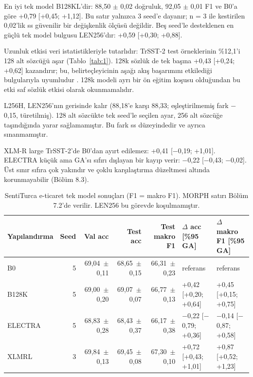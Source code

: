\documentclass[11pt]{article}
\begin{document}
En iyi tek model B128KL'dir: 88,50 $\pm$ 0,02 doğruluk, 92,05 $\pm$ 0,01 F1 ve B0'a göre +0,79 [+0,45; +1,12]. Bu satır yalnızca 3 seed'e dayanır; n = 3 ile kestirilen 0,02'lik ss güvenilir bir değişkenlik ölçüsü değildir. Beş seed'le desteklenen en güçlü tek model bulgusu LEN256'dır: +0,59 [+0,30; +0,88].

Uzunluk etkisi veri istatistikleriyle tutarlıdır: TrSST-2 test örneklerinin \%12,1'i 128 alt sözcüğü aşar (Tablo~\ref{tab:1}). 128k sözlük de tek başına +0,43 [+0,24; +0,62] kazandırır; bu, belirteçleyicinin aşağı akış başarımını etkilediği bulgularıyla uyumludur \citep{toraman2023,rust2021}. 128k modeli ayrı bir ön eğitim koşusu olduğundan bu etki saf sözlük etkisi olarak okunmamalıdır.

L256H, LEN256'nın gerisinde kalır (88,18'e karşı 88,33; eşleştirilmemiş fark $-$0,15, türetilmiş). 128 alt sözcükte tek seed'le seçilen ayar, 256 alt sözcüğe taşındığında yarar sağlamamıştır. Bu fark ss düzeyindedir ve ayrıca sınanmamıştır.

XLM-R large \citep{conneau2020} TrSST-2'de B0'dan ayırt edilemez: +0,41 [$-$0,19; +1,01]. ELECTRA \citep{clark2020} küçük ama GA'sı sıfırı dışlayan bir kayıp verir: $-$0,22 [$-$0,43; $-$0,02]. Üst sınır sıfıra çok yakındır ve çoklu karşılaştırma düzeltmesi altında korunmayabilir (Bölüm 8.3).

\begin{table}[!htbp]
\centering
\footnotesize
\setlength{\tabcolsep}{3pt}
\begin{tabular}{lrrrrll}
\toprule
Yapılandırma & Seed & Val acc & Test acc & Test makro F1 & $\Delta$ acc [\%95 GA] & $\Delta$ makro F1 [\%95 GA] \\
\midrule
B0 & \mbox{5} & \mbox{69,04 $\pm$ 0,11} & \mbox{68,65 $\pm$ 0,15} & \mbox{66,31 $\pm$ 0,23} & referans & referans \\
B128K & \mbox{5} & \mbox{69,00 $\pm$ 0,20} & \mbox{69,07 $\pm$ 0,07} & \mbox{66,77 $\pm$ 0,13} & +0,42 [+0,20; +0,64] & +0,45 [+0,15; +0,75] \\
ELECTRA & \mbox{5} & \mbox{68,83 $\pm$ 0,28} & \mbox{68,43 $\pm$ 0,37} & \mbox{66,17 $\pm$ 0,38} & $-$0,22 [$-$0,79; +0,36] & $-$0,14 [$-$0,87; +0,58] \\
XLMRL & \mbox{3} & \mbox{69,84 $\pm$ 0,13} & \mbox{69,45 $\pm$ 0,08} & \mbox{67,30 $\pm$ 0,10} & +0,72 [+0,43; +1,01] & +0,87 [+0,52; +1,23] \\
\bottomrule
\end{tabular}
\caption{SentiTurca e-ticaret tek model sonuçları (F1 = makro F1). MORPH satırı Bölüm 7.2'de verilir. LEN256 bu görevde koşulmamıştır.}
\label{tab:9}
\end{table}
\end{document}
